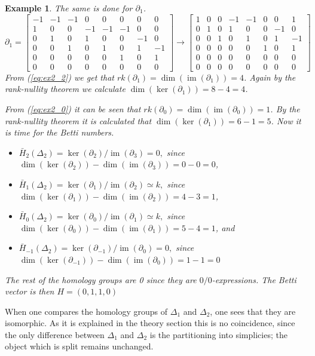 \documentclass[11pt,a4paper,twoside, openright]{report}
\newtheorem{myex}[mythm]{Example}
\DeclareMathOperator{\im}{im}
\begin{document}
\begin{myex}
The same is done for $\partial_1$.
\begin{equation}\label{eq:ex2_2}
\partial_1=
\begin{bmatrix}
-1 & -1 & -1 & 0 & 0 & 0 & 0 & 0 \\
1 & 0 & 0 & -1 & -1 & -1 & 0 & 0 \\
0 & 1 & 0 & 1 & 0 & 0 & -1 & 0 \\
0 & 0 & 1 & 0 & 1 & 0 & 1 & -1 \\
0 & 0 & 0 & 0 & 0 & 1 & 0 & 1 \\
0 & 0 & 0 & 0 & 0 & 0 & 0 & 0 
\end{bmatrix}
\to
\begin{bmatrix}
1 & 0 & 0 & -1 & -1 & 0 & 0 & 1 \\
0 & 1 & 0 & 1 & 0 & 0 & -1 & 0 \\
0 & 0 & 1 & 0 & 1 & 0 & 1 & -1 \\
0 & 0 & 0 & 0 & 0 & 1 & 0 & 1 \\
0 & 0 & 0 & 0 & 0 & 0 & 0 & 0 \\
0 & 0 & 0 & 0 & 0 & 0 & 0 & 0 
\end{bmatrix}
\end{equation}
From (\ref{eq:ex2_2}) we get that $rk(\partial_1)=\dim(\im(\partial_1))=4$. Again by the rank-nullity theorem we calculate $\dim(\ker(\partial_1))=8-4=4$.

From (\ref{eq:ex2_0}) it can be seen that $rk(\partial_0)=\dim(\im(\partial_0))=1$. By the rank-nullity theorem it is calculated that $\dim(\ker(\partial_1))=6-1=5$. Now it is time for the Betti numbers.
\begin{itemize}
\item $\bar{H}_2(\Delta_2)=\ker(\partial_2)/\im(\partial_{3})=0,$
since $\dim(\ker(\partial_2))-\dim(\im(\partial_{3}))=0-0=0$,
\item$\bar{H}_1(\Delta_2)=\ker(\partial_1)/\im(\partial_{2})\simeq k,$ since $\dim(\ker(\partial_1))-\dim(\im(\partial_{2}))=4-3=1$,
\item$\bar{H}_0(\Delta_2)=\ker(\partial_0)/\im(\partial_{1})\simeq k,$
since $\dim(\ker(\partial_0))-\dim(\im(\partial_{1}))=5-4=1$, and 
\item$\bar{H}_{-1}(\Delta_2)=\ker(\partial_{-1})/\im(\partial_{0})=0,$
since $\dim(\ker(\partial_{-1}))-\dim(\im(\partial_{0}))=1-1=0$
\end{itemize}
The rest of the homology groups are 0 since they are $0/0$-expressions.
The Betti vector is then $H=(0,1,1,0)$
\end{myex}
When one compares the homology groups of $\Delta_1$ and $\Delta_2$, one sees that they are isomorphic. As it is explained in the theory section this is no coincidence, since the only difference between $\Delta_1$ and $\Delta_2$ is the partitioning into simplicies; the object which is split remains unchanged.
\end{document}
